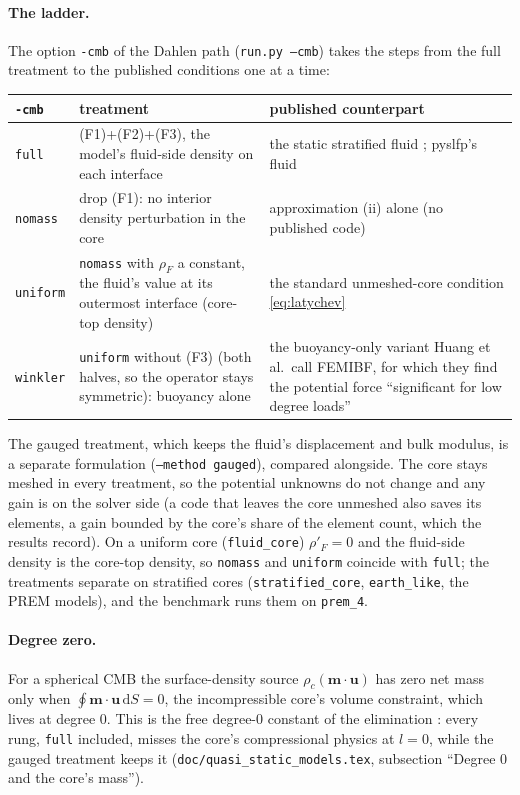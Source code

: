 \documentclass[11pt]{article}
\numberwithin{equation}{section}
\newcommand{\dS}{\,\mathrm{d}S}
\newcommand{\vu}{\mathbf{u}}
\newcommand{\vm}{\mathbf{m}}
\newcommand{\code}[1]{\texttt{#1}}
\begin{document}
\paragraph{The ladder.}
The option \code{-cmb} of the Dahlen path (\code{run.py --cmb}) takes the
steps from the full treatment to the published conditions one at a time:
\begin{center}
\small
\begin{tabular}{@{}lP{6.4cm}P{5.6cm}@{}}
\toprule
\code{-cmb} & treatment & published counterpart \\
\midrule
\code{full} & (F1)+(F2)+(F3), the model's fluid-side density on each interface & the static stratified fluid \cite{Dahlen1974,AW10}; pyslfp's fluid \\
\code{nomass} & drop (F1): no interior density perturbation in the core & approximation (ii) alone (no published code) \\
\code{uniform} & \code{nomass} with $\rho_F$ a constant, the fluid's value at its outermost interface (core-top density) & the standard unmeshed-core condition \eqref{eq:latychev} \cite{TrompMitrovica1999,Latychev2005,AWahrZhong2013,Huang2023,CitcomSVE2025} \\
\code{winkler} & \code{uniform} without (F3) (both halves, so the operator stays symmetric): buoyancy alone & the buoyancy-only variant Huang et al.\ call FEMIBF, for which they find the potential force ``significant for low degree loads'' \cite{Huang2023} \\
\bottomrule
\end{tabular}
\end{center}
The gauged treatment, which keeps the fluid's displacement and bulk
modulus, is a separate formulation (\code{--method gauged}), compared
alongside. The core stays meshed in every treatment, so the potential
unknowns do not change and any gain is on the solver side (a code that
leaves the core unmeshed also saves its elements, a gain bounded by the
core's share of the element count, which the results record). On a
uniform core (\code{fluid\_core}) $\rho'_F=0$ and the fluid-side density is
the core-top density, so \code{nomass} and \code{uniform} coincide with
\code{full}; the treatments separate on stratified cores
(\code{stratified\_core}, \code{earth\_like}, the PREM models), and the
benchmark runs them on \code{prem\_4}.

\paragraph{Degree zero.}
For a spherical CMB the surface-density source $\rho_c(\vm\cdot\vu)$ has
zero net mass only when $\oint\vm\cdot\vu\dS=0$, the incompressible core's
volume constraint, which lives at degree 0. This is the free degree-0
constant of the elimination \cite{AW10}: every rung, \code{full} included,
misses the core's compressional physics at $l=0$, while the gauged
treatment keeps it (\code{doc/quasi\_static\_models.tex}, subsection
``Degree 0 and the core's mass'').
\end{document}
